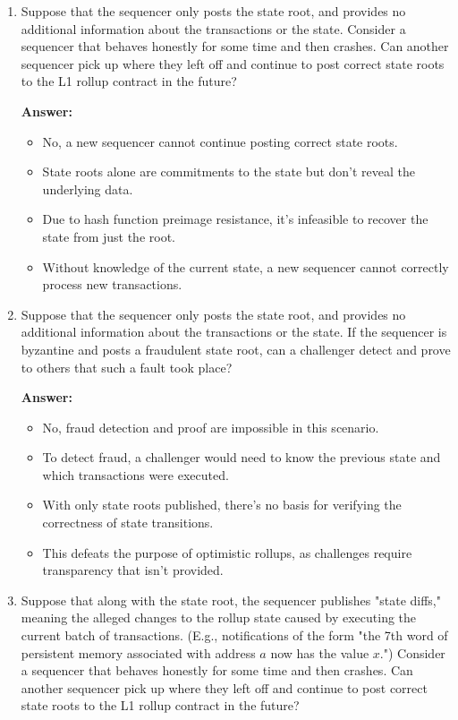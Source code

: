 \documentclass{article}
\begin{document}
\begin{enumerate}
\item Suppose that the sequencer only posts the state root, and provides no additional information about the transactions or the state. Consider a sequencer that behaves honestly for some time and then crashes. Can another sequencer pick up where they left off and continue to post correct state roots to the L1 rollup contract in the future?

\textbf{Answer:}

\begin{itemize}
\item No, a new sequencer cannot continue posting correct state roots.
\item State roots alone are commitments to the state but don't reveal the underlying data.
\item Due to hash function preimage resistance, it's infeasible to recover the state from just the root.
\item Without knowledge of the current state, a new sequencer cannot correctly process new transactions.
\end{itemize}

\item Suppose that the sequencer only posts the state root, and provides no additional information about the transactions or the state. If the sequencer is byzantine and posts a fraudulent state root, can a challenger detect and prove to others that such a fault took place?

\textbf{Answer:}

\begin{itemize}
\item No, fraud detection and proof are impossible in this scenario.
\item To detect fraud, a challenger would need to know the previous state and which transactions were executed.
\item With only state roots published, there's no basis for verifying the correctness of state transitions.
\item This defeats the purpose of optimistic rollups, as challenges require transparency that isn't provided.
\end{itemize}

\item Suppose that along with the state root, the sequencer publishes "state diffs," meaning the alleged changes to the rollup state caused by executing the current batch of transactions. (E.g., notifications of the form "the 7th word of persistent memory associated with address $a$ now has the value $x$.") Consider a sequencer that behaves honestly for some time and then crashes. Can another sequencer pick up where they left off and continue to post correct state roots to the L1 rollup contract in the future?


\end{enumerate}
\end{document}
